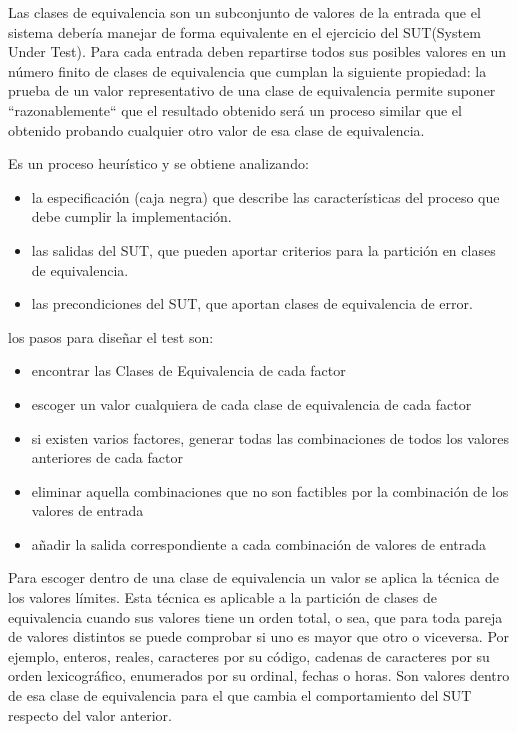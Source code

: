 Las clases de equivalencia son un subconjunto de valores de la entrada que el sistema debería manejar de forma equivalente en el ejercicio del \gls{SUT}(System Under Test). Para cada entrada deben repartirse todos sus posibles valores en un número finito de clases de equivalencia que cumplan la siguiente propiedad: la prueba de un valor representativo de una clase de equivalencia permite suponer “razonablemente“ que el resultado obtenido será un proceso similar que el obtenido probando cualquier otro valor de esa clase de equivalencia.

Es un proceso heurístico y se obtiene analizando:
\begin{itemize}
    \item la especificación (caja negra) que describe las características del proceso que debe cumplir la implementación.
    \item las salidas del SUT, que pueden aportar criterios para la partición en clases de equivalencia.
    \item las precondiciones del SUT, que aportan clases de equivalencia de error.
\end{itemize}

los pasos para diseñar el test son:
\begin{itemize}
    \item encontrar las Clases de Equivalencia de cada factor
    \item escoger un valor cualquiera de cada clase de equivalencia de cada factor
    \item si existen varios factores, generar todas las combinaciones de todos los valores anteriores de cada factor
    \item eliminar aquella combinaciones que no son factibles por la combinación de los valores de entrada
    \item añadir la salida correspondiente a cada combinación de valores de entrada
\end{itemize}

Para escoger dentro de una clase de equivalencia un valor se aplica la técnica de los valores límites. Esta técnica es aplicable a la partición de clases de equivalencia cuando sus valores tiene un orden total, o sea, que para toda pareja de valores distintos se puede comprobar si uno es mayor que otro o viceversa. Por ejemplo, enteros, reales, caracteres por su código, cadenas de caracteres por su orden lexicográfico, enumerados por su ordinal, fechas o horas. Son valores dentro de esa clase de equivalencia para el que cambia el comportamiento del SUT respecto del valor anterior.

